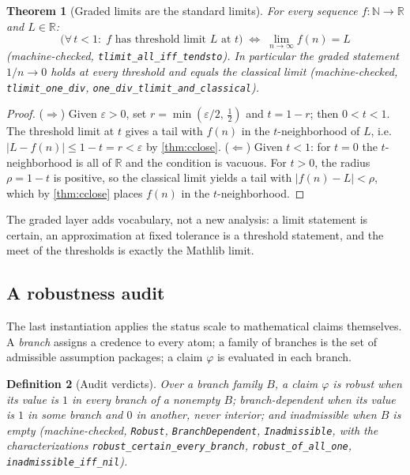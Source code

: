 \documentclass[11pt,a4paper]{article}
\newtheorem{theorem}{Theorem}[section]
\newtheorem{definition}[theorem]{Definition}
\newcommand{\Real}{\mathbb{R}}
\newcommand{\Nat}{\mathbb{N}}
\begin{document}
\begin{theorem}[Graded limits are the standard limits]
\label{thm:tlimit}
For every sequence $f : \Nat \to \Real$ and $L \in \Real$:
\[
  \bigl(\forall\, t < 1:\; f \text{ has threshold limit } L
  \text{ at } t\bigr)
  \;\iff\;
  \lim_{n \to \infty} f(n) = L
\]
(machine-checked, \texttt{tlimit\_all\_iff\_tendsto}).
In particular the graded statement
$1/n \to 0$ holds at every threshold and equals the classical limit
(machine-checked, \texttt{tlimit\_one\_div},
\texttt{one\_div\_tlimit\_and\_classical}).
\end{theorem}
\begin{proof}
($\Rightarrow$)
Given $\varepsilon > 0$, set
$r = \min(\varepsilon/2,\, \tfrac{1}{2})$ and $t = 1 - r$; then
$0 < t < 1$.
The threshold limit at $t$ gives a tail with
$f(n)$ in the $t$-neighborhood of $L$, i.e.\
$|L - f(n)| \le 1 - t = r < \varepsilon$ by \cref{thm:cclose}.
($\Leftarrow$)
Given $t < 1$: for $t = 0$ the $t$-neighborhood is all of $\Real$ and
the condition is vacuous.
For $t > 0$, the radius $\rho = 1 - t$ is positive, so the classical
limit yields a tail with $|f(n) - L| < \rho$, which by
\cref{thm:cclose} places $f(n)$ in the $t$-neighborhood.
\end{proof}

The graded layer adds vocabulary, not a new analysis: a limit
statement is certain, an approximation at fixed tolerance is a
threshold statement, and the meet of the thresholds is exactly the
Mathlib limit.

\subsection{A robustness audit}
\label{sec:audit}

The last instantiation applies the status scale to mathematical claims
themselves.
A \emph{branch} assigns a credence to every atom; a family of branches
is the set of admissible assumption packages; a claim $\varphi$ is
evaluated in each branch.

\begin{definition}[Audit verdicts]
\label{def:audit}
Over a branch family $B$, a claim $\varphi$ is
\emph{robust} when its value is $1$ in every branch of a nonempty $B$; %
\emph{branch-dependent} when its value is $1$ in some branch and $0$ in
another, never interior; and
\emph{inadmissible} when $B$ is empty
(machine-checked, \texttt{Robust}, \texttt{BranchDependent}, %
\texttt{Inadmissible}, with the characterizations
\texttt{robust\_certain\_every\_branch}, %
\texttt{robust\_of\_all\_one}, \texttt{inadmissible\_iff\_nil}). %
\end{definition}
\end{document}
